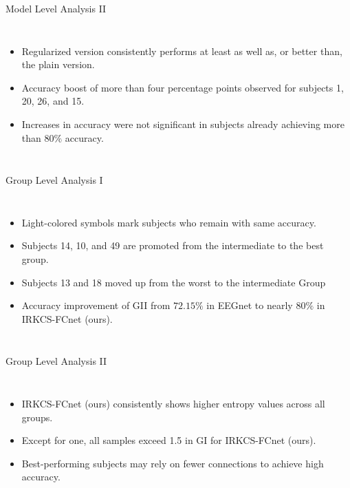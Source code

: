 \documentclass[aspectratio=169]{beamer}
\begin{document}
\begin{frame}{Model Level Analysis II} 
    \begin{columns}
            \begin{itemize}
                \item Regularized version consistently performs at least as well as, or better than, the plain version.
                \item Accuracy boost of more than four percentage points observed for subjects 1, 20, 26, and 15.
                \item Increases in accuracy were not significant in subjects already achieving more than $80\%$ accuracy.
            \end{itemize}
            \centering
            \resizebox{1\linewidth}{!}{}
    \end{columns}     
\end{frame}

\begin{frame}{Group Level Analysis I}
    \begin{columns}
            \centering
            \resizebox{1\linewidth}{!}{}
            \begin{itemize}
                \item Light-colored symbols mark subjects who remain with same accuracy.
                \item Subjects 14, 10, and 49 are promoted from the intermediate to the best group.
                \item Subjects 13 and 18 moved up from the worst to the intermediate Group
                \item Accuracy improvement of GII from $72.15\%$ in EEGnet to nearly $80\%$ in IRKCS-FCnet (ours).
            \end{itemize}
    \end{columns}       
\end{frame}

\begin{frame}{Group Level Analysis II}
    \begin{columns}
        \begin{itemize}
            \item IRKCS-FCnet (ours) consistently shows higher entropy values across all groups.
            \item Except for one, all samples exceed 1.5 in GI for IRKCS-FCnet (ours).
            \item Best-performing subjects may rely on fewer connections to achieve high accuracy.
        \end{itemize}
            \centering
            \resizebox{1\linewidth}{!}{}
    \end{columns}  
\end{frame}
\end{document}
